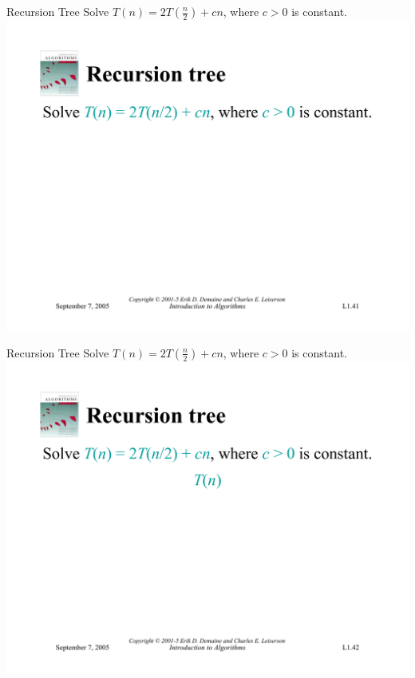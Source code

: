 \documentclass{beamer}
\begin{document}
\begin{frame}{Recursion Tree}
    Solve $T(n) = 2T(\frac{n}{2}) + cn$, where $c > 0$ is constant.\\
    \vspace{5mm}
    \centering
    \includegraphics[width=\textwidth, trim={0.49cm 1.25cm 0.7cm 5.75cm}, clip]{pages/lec1_41}
\end{frame}
\begin{frame}{Recursion Tree}
    Solve $T(n) = 2T(\frac{n}{2}) + cn$, where $c > 0$ is constant.\\
    \vspace{5mm}
    \centering
    \includegraphics[width=\textwidth, trim={0.49cm 1.25cm 0.7cm 5.75cm}, clip]{pages/lec1_42}
\end{frame}
\end{document}
